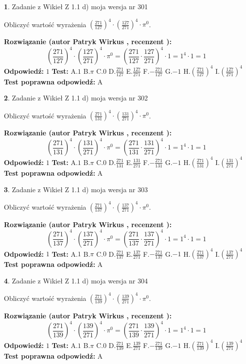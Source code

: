 \documentclass[12pt, a4paper]{article}
\theoremstyle{definition} %
\newtheorem{zad}{}
\newcommand{\zadStart}[1]{\begin{zad}#1\newline}
\newcommand{\zadStop}{\end{zad}}
\newcommand{\rozwStart}[2]{\noindent \textbf{Rozwiązanie (autor #1 , recenzent #2): }\newline}
\newcommand{\rozwStop}{\newline}
\newcommand{\odpStart}{\noindent \textbf{Odpowiedź:}\newline}
\newcommand{\odpStop}{\newline}
\newcommand{\testStart}{\noindent \textbf{Test:}\newline}
\newcommand{\testStop}{\newline}
\newcommand{\kluczStart}{\noindent \textbf{Test poprawna odpowiedź:}\newline}
\newcommand{\kluczStop}{\newline}
\begin{document}
\zadStart{Zadanie z Wikieł Z 1.1 d) moja wersja nr 301}

Obliczyć wartość wyrażenia $(\frac{271}{127})^{4} \cdot (\frac{127}{271})^{4} \cdot \pi^{0}$.
\zadStop
\rozwStart{Patryk Wirkus}{}
$$(\frac{271}{127})^{4} \cdot (\frac{127}{271})^{4} \cdot \pi^{0} = (\frac{271}{127} \cdot \frac{127}{271})^{4} \cdot 1 = 1^{4} \cdot 1 = 1$$
\rozwStop
\odpStart
$1$
\odpStop
\testStart
A.$1$ B.$\pi$ C.$0$ D.$\frac{271}{127}$ E.$\frac{127}{271}$
F.$-\frac{271}{127}$ G.$-1$
H.$(\frac{271}{127})^{4}$
I.$(\frac{127}{271})^{4}$
\testStop
\kluczStart
A
\kluczStop



\zadStart{Zadanie z Wikieł Z 1.1 d) moja wersja nr 302}

Obliczyć wartość wyrażenia $(\frac{271}{131})^{4} \cdot (\frac{131}{271})^{4} \cdot \pi^{0}$.
\zadStop
\rozwStart{Patryk Wirkus}{}
$$(\frac{271}{131})^{4} \cdot (\frac{131}{271})^{4} \cdot \pi^{0} = (\frac{271}{131} \cdot \frac{131}{271})^{4} \cdot 1 = 1^{4} \cdot 1 = 1$$
\rozwStop
\odpStart
$1$
\odpStop
\testStart
A.$1$ B.$\pi$ C.$0$ D.$\frac{271}{131}$ E.$\frac{131}{271}$
F.$-\frac{271}{131}$ G.$-1$
H.$(\frac{271}{131})^{4}$
I.$(\frac{131}{271})^{4}$
\testStop
\kluczStart
A
\kluczStop



\zadStart{Zadanie z Wikieł Z 1.1 d) moja wersja nr 303}

Obliczyć wartość wyrażenia $(\frac{271}{137})^{4} \cdot (\frac{137}{271})^{4} \cdot \pi^{0}$.
\zadStop
\rozwStart{Patryk Wirkus}{}
$$(\frac{271}{137})^{4} \cdot (\frac{137}{271})^{4} \cdot \pi^{0} = (\frac{271}{137} \cdot \frac{137}{271})^{4} \cdot 1 = 1^{4} \cdot 1 = 1$$
\rozwStop
\odpStart
$1$
\odpStop
\testStart
A.$1$ B.$\pi$ C.$0$ D.$\frac{271}{137}$ E.$\frac{137}{271}$
F.$-\frac{271}{137}$ G.$-1$
H.$(\frac{271}{137})^{4}$
I.$(\frac{137}{271})^{4}$
\testStop
\kluczStart
A
\kluczStop



\zadStart{Zadanie z Wikieł Z 1.1 d) moja wersja nr 304}

Obliczyć wartość wyrażenia $(\frac{271}{139})^{4} \cdot (\frac{139}{271})^{4} \cdot \pi^{0}$.
\zadStop
\rozwStart{Patryk Wirkus}{}
$$(\frac{271}{139})^{4} \cdot (\frac{139}{271})^{4} \cdot \pi^{0} = (\frac{271}{139} \cdot \frac{139}{271})^{4} \cdot 1 = 1^{4} \cdot 1 = 1$$
\rozwStop
\odpStart
$1$
\odpStop
\testStart
A.$1$ B.$\pi$ C.$0$ D.$\frac{271}{139}$ E.$\frac{139}{271}$
F.$-\frac{271}{139}$ G.$-1$
H.$(\frac{271}{139})^{4}$
I.$(\frac{139}{271})^{4}$
\testStop
\kluczStart
A
\kluczStop
\end{document}
